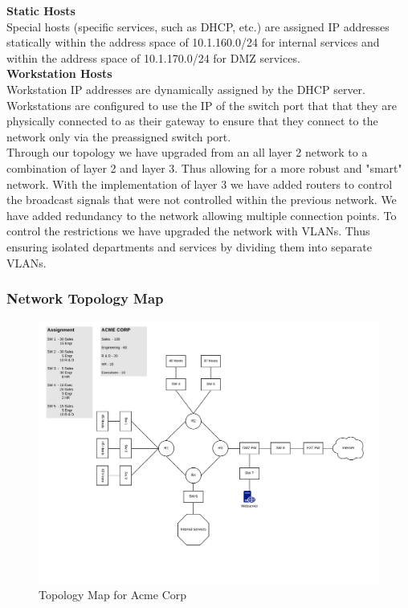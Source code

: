 \noindent
\textbf{Static Hosts} \\
Special hosts (specific services, such as DHCP, etc.) are assigned IP addresses 
statically within the address space of 10.1.160.0/24 for internal services and
within the address space of 10.1.170.0/24 for DMZ services. \\

\noindent
\textbf{Workstation Hosts} \\
Workstation IP addresses are dynamically assigned by the DHCP server. 
Workstations are configured to use the IP of the switch port that that they are
physically connected to as their gateway to ensure that they connect to the 
network only via the preassigned switch port. \\

Through our topology we have upgraded from an all layer 2 network to a 
combination of layer 2 and layer 3. Thus allowing for a more robust and "smart" 
network. With the implementation of layer 3 we have added routers to control 
the broadcast signals that were not controlled within the previous network. We 
have added redundancy to the network allowing multiple connection points. To 
control the restrictions we have upgraded the network with VLANs. Thus ensuring 
isolated departments and services by dividing them into separate VLANs. 
 
\subsubsection{Network Topology Map}
\begin{figure}[!htb]
	\includegraphics[width=\textwidth]{images/networktopology.png}
	\caption{Topology Map for Acme Corp}
\end{figure}
